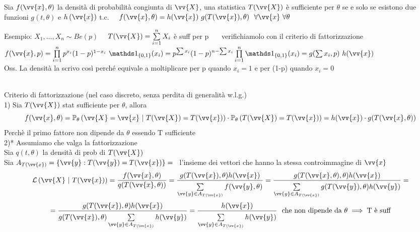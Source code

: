 \begin{teo}
Sia $f(\vv{x},\theta)$ la densità di probabilità congiunta di $\vv{X}$, una statistica $T( \vv{X})$ è sufficiente per $\theta$ se e solo se
esistono due funzioni $g(t,\theta)$ e $h\O\vv{x}\C$ t.c.  \ \  $f(\vv{x},\theta)=h(\vv{x})\ g(T(\vv{x}),\theta) \ \ \forall \vv{x} \ \forall \theta$
\end{teo}

\phantom{}

Esempio: $X_1,...,X_n \sim Be(p)$ \ \ $T(\vv{X}) = \Sum{i=1}{n}X_i$ è suff per p \ \ \ verifichiamolo con il criterio di fattorizzazione \\ $f(\vv{x},p)=\Prod{i=1}{n} p^{x_i}(1-p)^{1-x_i}\ \II_{\{0,1\}}(x_i) = p^{\sum x_i} (1-p)^{n-\sum x_i} \Prod{i=1}{n} \II_{\{0,1\}}(x_i) = g(\sum x_i, p) \ h(\vv{x})$ \\
Oss. La densità la scrivo così perché equivale a moltiplicare per p quando $x_i=1$ e per (1-p) quando $x_i=0$ \\ \\



\begin{Dim} Criterio di fattorizzazione (nel caso discreto, senza perdita di generalità w.l.g.)\\
1) Sia $T(\vv{X})$ stat sufficiente per $\theta$, allora
\[f(\vv{x},\theta)= \PP_{\theta}\O \vv{X}=\vv{x} \ |\ T(\vv{X})=T(\vv{x})\C \cdot \PP_{\theta}\O T(\vv{X})=T(\vv{x}) \C = h(\vv{x})\cdot g(T(\vv{x},\theta))\]
Perchè il primo fattore non dipende da $\theta$ essendo T sufficiente\\
2)* Assumiamo che valga la fattorizzazione\\
Sia $q(t,\theta)$ la densità di prob di $T(\vv{X})$ \\
Sia $A_{T(\vv{x})}= \{\vv{y}: T(\vv{y})=T(\vv{x})\} =$ \  l'insieme dei vettori che hanno la stessa controimmagine di $\vv{x}$ 
\[ \Lc\O \vv{X} \ |\ T(\vv{x})\C= \frac{f(\vv{x},\theta)}{q(T(\vv{x},\theta))}=\frac{g(T(\vv{x}),\theta)h(\vv{x})}{\Sum{\vv{y}\in A_{T(\vv{x})}}{} f(\vv{y}, \theta)}=\frac{g(T(\vv{x},\theta),\theta) h(\vv{x})}{\Sum{\vv{y}\in A_{T(\vv{x})}}{} g(T(\vv{y}),\theta)h(\vv{y})} =\]\[
=\frac{g(T(\vv{x}),\theta)h(\vv{x})}{g(T(\vv{x}),\theta) \Sum{\vv{y}\in A_{T(\vv{x})}}{}h(\vv{y})} = \frac{h(\vv{x})}{\Sum{\vv{y}\in A_{T(\vv{x})}}{}h(\vv{y})} \ \text{ che non dipende da } \theta \implies \text{T è suff}\] 

\end{Dim}



